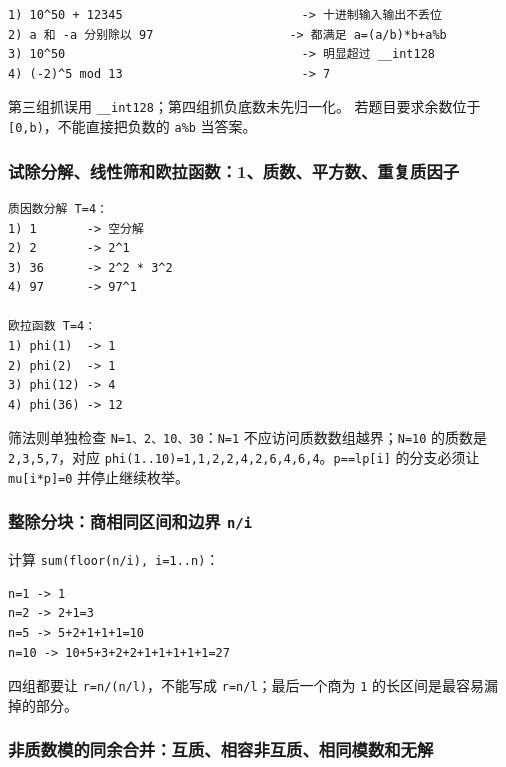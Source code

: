 \begin{lstlisting}
1) 10^50 + 12345                         -> 十进制输入输出不丢位
2) a 和 -a 分别除以 97                   -> 都满足 a=(a/b)*b+a%b
3) 10^50                                 -> 明显超过 __int128
4) (-2)^5 mod 13                         -> 7
\end{lstlisting}

第三组抓误用 \passthrough{\lstinline!__int128!}；第四组抓负底数未先归一化。
若题目要求余数位于 \passthrough{\lstinline![0,b)!}，不能直接把负数的
\passthrough{\lstinline!a\%b!} 当答案。

\subsubsection{试除分解、线性筛和欧拉函数：1、质数、平方数、重复质因子}

\begin{lstlisting}
质因数分解 T=4：
1) 1       -> 空分解
2) 2       -> 2^1
3) 36      -> 2^2 * 3^2
4) 97      -> 97^1

欧拉函数 T=4：
1) phi(1)  -> 1
2) phi(2)  -> 1
3) phi(12) -> 4
4) phi(36) -> 12
\end{lstlisting}

筛法则单独检查 \passthrough{\lstinline!N=1、2、10、30!}：\passthrough{\lstinline!N=1!} 不应访问质数数组越界；\passthrough{\lstinline!N=10!} 的质数是 \passthrough{\lstinline!2,3,5,7!}，对应 \passthrough{\lstinline!phi(1..10)=1,1,2,2,4,2,6,4,6,4!}。\passthrough{\lstinline!p==lp[i]!} 的分支必须让 \passthrough{\lstinline!mu[i*p]=0!} 并停止继续枚举。

\subsubsection{\texorpdfstring{整除分块：商相同区间和边界 \texttt{n/i}}{整除分块：商相同区间和边界 n/i}}

计算 \passthrough{\lstinline!sum(floor(n/i), i=1..n)!}：

\begin{lstlisting}
n=1 -> 1
n=2 -> 2+1=3
n=5 -> 5+2+1+1+1=10
n=10 -> 10+5+3+2+2+1+1+1+1+1=27
\end{lstlisting}

四组都要让 \passthrough{\lstinline!r=n/(n/l)!}，不能写成 \passthrough{\lstinline!r=n/l!}；最后一个商为 \passthrough{\lstinline!1!} 的长区间是最容易漏掉的部分。

\subsubsection{非质数模的同余合并：互质、相容非互质、相同模数和无解}


